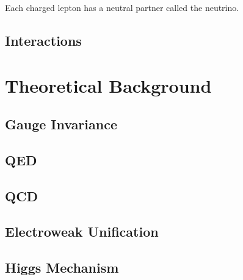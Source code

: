 Each charged lepton has a neutral partner called the neutrino. 

\subsection{Interactions}

\section{Theoretical Background}

\subsection{Gauge Invariance}

\subsection{QED}

\subsection{QCD}

\subsection{Electroweak Unification}

\subsection{Higgs Mechanism}


